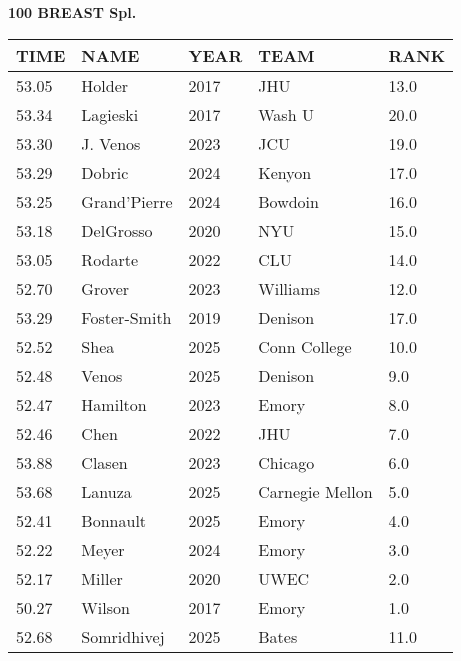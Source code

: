 \begin{center}
\begin{minipage}[t]{0.7\textwidth}
\centering
\textbf{100 BREAST Spl.}\\[0.05cm]
\begin{tabular}{@{}p{1.8cm}p{2.8cm}p{1.2cm}p{1.4cm}p{0.8cm}@{}}
\hline
\textbf{TIME} & \textbf{NAME} & \textbf{YEAR} & \textbf{TEAM} & \textbf{RANK} \\
\hline
53.05 & Holder & 2017 & JHU & 13.0 \\
53.34 & Lagieski & 2017 & Wash U & 20.0 \\
53.30 & J. Venos & 2023 & JCU & 19.0 \\
53.29 & Dobric & 2024 & Kenyon & 17.0 \\
53.25 & Grand'Pierre & 2024 & Bowdoin & 16.0 \\
53.18 & DelGrosso & 2020 & NYU & 15.0 \\
53.05 & Rodarte & 2022 & CLU & 14.0 \\
52.70 & Grover & 2023 & Williams & 12.0 \\
53.29 & Foster-Smith & 2019 & Denison & 17.0 \\
52.52 & Shea & 2025 & Conn College & 10.0 \\
52.48 & Venos & 2025 & Denison & 9.0 \\
52.47 & Hamilton & 2023 & Emory & 8.0 \\
52.46 & Chen & 2022 & JHU & 7.0 \\
53.88 & Clasen & 2023 & Chicago & 6.0 \\
53.68 & Lanuza & 2025 & Carnegie Mellon & 5.0 \\
52.41 & Bonnault & 2025 & Emory & 4.0 \\
52.22 & Meyer & 2024 & Emory & 3.0 \\
52.17 & Miller & 2020 & UWEC & 2.0 \\
50.27 & Wilson & 2017 & Emory & 1.0 \\
52.68 & Somridhivej & 2025 & Bates & 11.0 \\
\hline
\end{tabular}
\end{minipage}
\end{center}

\vspace{0.4cm}

